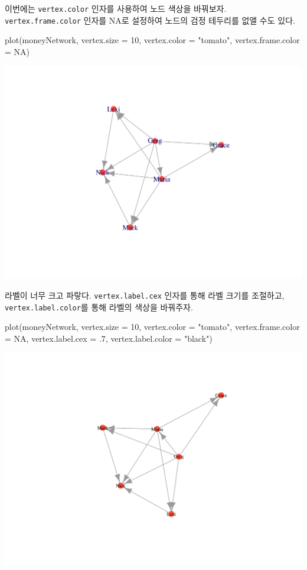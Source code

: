 \documentclass[
]{book}
\newenvironment{Shaded}{\begin{snugshade}}{\end{snugshade}}
\newcommand{\AttributeTok}[1]{\textcolor[rgb]{0.77,0.63,0.00}{#1}}
\newcommand{\ConstantTok}[1]{\textcolor[rgb]{0.00,0.00,0.00}{#1}}
\newcommand{\DecValTok}[1]{\textcolor[rgb]{0.00,0.00,0.81}{#1}}
\newcommand{\FunctionTok}[1]{\textcolor[rgb]{0.00,0.00,0.00}{#1}}
\newcommand{\NormalTok}[1]{#1}
\newcommand{\StringTok}[1]{\textcolor[rgb]{0.31,0.60,0.02}{#1}}
\begin{document}
이번에는 \texttt{vertex.color} 인자를 사용하여 노드 색상을 바꿔보자. \texttt{vertex.frame.color} 인자를 NA로 설정하여 노드의 검정 테두리를 없앨 수도 있다.

\begin{Shaded}
\begin{Highlighting}[]
\FunctionTok{plot}\NormalTok{(moneyNetwork, }\AttributeTok{vertex.size =} \DecValTok{10}\NormalTok{, }\AttributeTok{vertex.color =} \StringTok{"tomato"}\NormalTok{, }\AttributeTok{vertex.frame.color =} \ConstantTok{NA}\NormalTok{)}
\end{Highlighting}
\end{Shaded}

\begin{center}\includegraphics[width=0.8\linewidth]{images/4} \end{center}

라벨이 너무 크고 파랗다. \texttt{vertex.label.cex} 인자를 통해 라벨 크기를 조절하고, \texttt{vertex.label.color}를 통해 라벨의 색상을 바꿔주자.

\begin{Shaded}
\begin{Highlighting}[]
\FunctionTok{plot}\NormalTok{(moneyNetwork, }\AttributeTok{vertex.size =} \DecValTok{10}\NormalTok{, }\AttributeTok{vertex.color =} \StringTok{"tomato"}\NormalTok{, }\AttributeTok{vertex.frame.color =} \ConstantTok{NA}\NormalTok{, }\AttributeTok{vertex.label.cex =}\NormalTok{ .}\DecValTok{7}\NormalTok{, }\AttributeTok{vertex.label.color =} \StringTok{"black"}\NormalTok{)}
\end{Highlighting}
\end{Shaded}

\begin{center}\includegraphics[width=0.8\linewidth]{images/5} \end{center}
\end{document}
